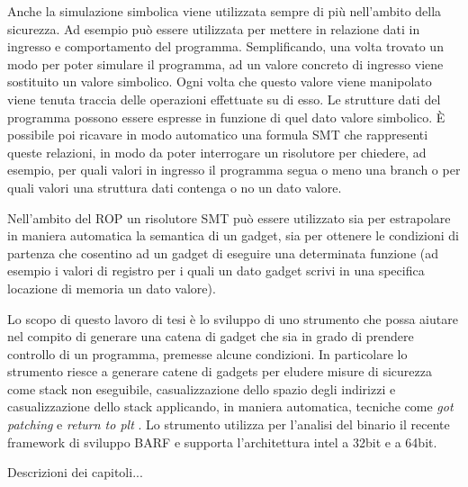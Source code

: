 Anche la simulazione simbolica viene utilizzata sempre di più
nell'ambito della sicurezza. Ad esempio può essere utilizzata per
mettere in relazione dati in ingresso e comportamento del
programma. Semplificando, una volta trovato un modo per poter simulare
il programma, ad un valore concreto di ingresso viene sostituito un
valore simbolico. Ogni volta che questo valore viene manipolato viene
tenuta traccia delle operazioni effettuate su di esso. Le strutture
dati del programma possono essere espresse in funzione di quel dato
valore simbolico. È possibile poi ricavare in modo automatico una
formula SMT che rappresenti queste relazioni, in modo da poter
interrogare un risolutore per chiedere, ad esempio, per quali valori
in ingresso il programma segua o meno una branch o per quali valori
una struttura dati contenga o no un dato valore.

Nell'ambito del ROP un risolutore SMT può essere utilizzato sia per
estrapolare in maniera automatica la semantica di un gadget, sia per
ottenere le condizioni di partenza che cosentino ad un gadget di
eseguire una determinata funzione (ad esempio i valori di registro per
i quali un dato gadget scrivi in una specifica locazione di memoria un
dato valore).

Lo scopo di questo lavoro di tesi è lo sviluppo di uno strumento che
possa aiutare nel compito di generare una catena di gadget che sia in
grado di prendere controllo di un programma, premesse alcune
condizioni. In particolare lo strumento riesce a generare catene di
gadgets per eludere misure di sicurezza come stack non eseguibile,
casualizzazione dello spazio degli indirizzi e casualizzazione dello
stack applicando, in maniera automatica, tecniche come \emph{got
  patching} e \emph{return to plt} \cite{roglia:2009}. Lo strumento
utilizza per l'analisi del binario il recente framework di sviluppo
BARF \cite{Heitman-14} e supporta l'architettura intel a 32bit e a
64bit.

Descrizioni dei capitoli...




